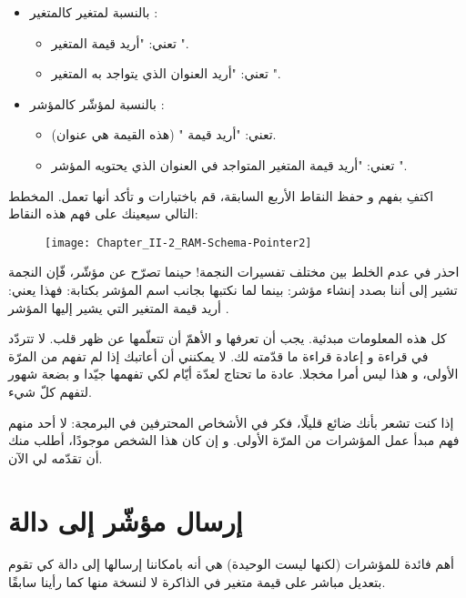\begin{itemize}
	\item بالنسبة لمتغير كالمتغير
:
	\begin{itemize}
		\item {} تعني: "أريد قيمة المتغير
".
		\item {}
تعني: "أريد العنوان الذي يتواجد به المتغير
".
	\end{itemize}
	\item بالنسبة لمؤشّر كالمؤشر
:
	\begin{itemize}
		\item {}
تعني: "أريد قيمة
"
(هذه القيمة هي عنوان).
		\item {}
تعني: "أريد قيمة المتغير المتواجد في العنوان الذي يحتويه المؤشر
".
	\end{itemize}
\end{itemize}

اكتفِ بفهم و حفظ النقاط الأربع السابقة، قم باختبارات و تأكد أنها تعمل. المخطط التالي سيعينك على فهم هذه النقاط:

\begin{figure}[H]
	\centering
	\texttt{[image: Chapter\_II-2\_RAM-Schema-Pointer2]}
\end{figure}


\begin{warning}
احذر في عدم الخلط بين مختلف تفسيرات النجمة! حينما تصرّح عن مؤشّر، فّإن النجمة تشير إلى أننا بصدد إنشاء مؤشر:
بينما لما نكتبها بجانب اسم المؤشر بكتابة:
فهذا يعني: أريد قيمة المتغير التي يشير إليها المؤشر
.
\end{warning}

كل هذه المعلومات مبدئية. يجب أن تعرفها و الأهمّ أن تتعلّمها عن ظهر قلب. لا تتردّد في قراءة و إعادة قراءة ما قدّمته لك. لا يمكنني أن أعاتبك إذا لم تفهم من المرّة الأولى، و هذا ليس أمرا مخجلا. عادة ما تحتاج لعدّة أيّام لكي تفهمها جيّدا و بضعة شهور لتفهم كلّ شيء.

إذا كنت تشعر بأنك ضائع قليلًا، فكر في الأشخاص المحترفين في البرمجة: لا أحد منهم فهم مبدأ عمل المؤشرات من المرّة الأولى. و إن كان هذا الشخص موجودًا، أطلب منك أن تقدّمه لي الآن.

\section{إرسال مؤشّر إلى دالة}
أهم فائدة للمؤشرات (لكنها ليست الوحيدة) هي أنه بامكاننا إرسالها إلى دالة كي تقوم بتعديل مباشر على قيمة متغير في الذاكرة لا لنسخة منها كما رأينا سابقًا.

